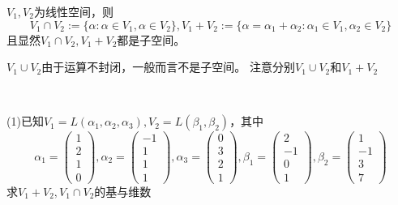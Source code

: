\begin{definition}[线性空间和与交]
  $V_1,V_2$为线性空间，则
  \begin{equation*}
    V_1 \cap V_2 := \{\alpha: \alpha \in V_1, \alpha \in V_2\}, V_1 + V_2 := \{\alpha = \alpha_1 + \alpha_2: \alpha_1 \in V_1, \alpha_2 \in V_2\}
  \end{equation*}
  且显然$V_1 \cap V_2, V_1 + V_2$都是子空间。
\end{definition}

\begin{note}
  $V_1 \cup V_2$由于运算不封闭，一般而言不是子空间。
  注意分别$V_1 \cup V_2$和$V_1 + V_2$
\end{note}

~

\begin{exercise}[和与交基本计算]
  (1)已知$V_1 = L(\alpha_1,\alpha_2,\alpha_3), V_2 = L(\beta_1,\beta_2)$，其中
  \begin{equation*}
    \alpha_1 = \left(
      \begin{array}{c}
        1\\
        2\\
        1\\
        0
      \end{array}
    \right), \alpha_2 = \left(
      \begin{array}{c}
        -1\\
        1\\
        1\\
        1
      \end{array}
    \right), \alpha_3 = \left(
      \begin{array}{c}
        0\\
        3\\
        2\\
        1
      \end{array}
    \right), \beta_1 = \left(
      \begin{array}{c}
        2\\
        -1\\
        0\\
        1
      \end{array}
    \right), \beta_2 = \left(
      \begin{array}{c}
        1\\
        -1\\
        3\\
        7
      \end{array}
    \right)
  \end{equation*}
  求$V_1 + V_2, V_1 \cap V_2$的基与维数


\end{exercise}
